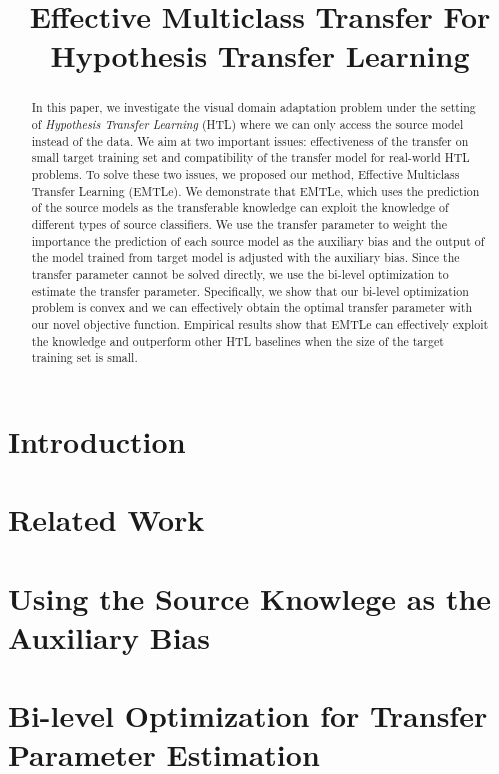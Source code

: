 \documentclass{llncs}
\begin{document}
\title{Effective Multiclass Transfer For Hypothesis Transfer Learning}
\maketitle
\begin{abstract}
	In this paper, we investigate the visual domain adaptation problem under the setting of \textit{Hypothesis Transfer Learning} (HTL) where we can only access the source model instead of the data. We aim at two important issues: effectiveness of the transfer on small target training set and compatibility of the transfer model for real-world HTL problems. To solve these two issues, we proposed our method, Effective Multiclass Transfer Learning (EMTLe).
	We demonstrate that EMTLe, which uses the prediction of the source models as the transferable knowledge can exploit the knowledge of different types of source classifiers. We use the transfer parameter to weight the importance the prediction of each source model as the auxiliary bias and the output of the model trained from target model is adjusted with the auxiliary bias. Since the transfer parameter cannot be solved directly, we use the bi-level optimization to estimate the transfer parameter. Specifically, we show that our bi-level optimization problem is convex and we can effectively obtain the optimal transfer parameter with our novel objective function. Empirical results show that EMTLe can effectively exploit the knowledge and outperform other HTL baselines when the size of the target training set is small.  
\end{abstract}

\section{Introduction}


\section{Related Work}\label{sec:work}


\section{Using the Source Knowlege as the Auxiliary Bias}\label{sec:prob}


\section{Bi-level Optimization for Transfer Parameter Estimation}\label{sec:smitle}
\end{document}
